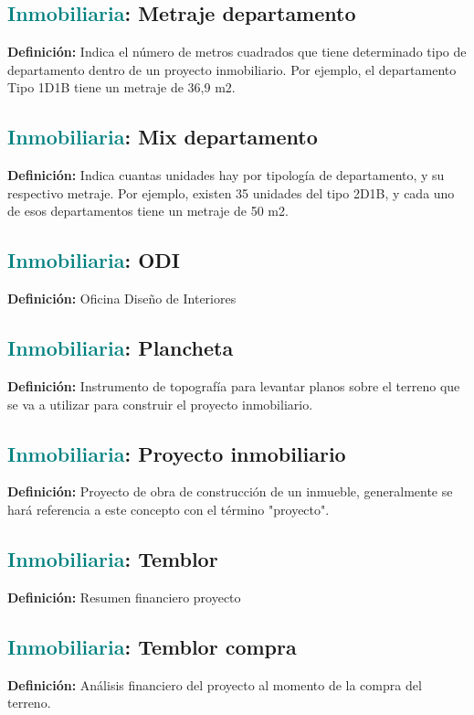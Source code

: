 \documentclass[12pt]{article}
\begin{document}
\subsection{\textcolor{teal}{Inmobiliaria}: Metraje departamento}
\textbf{Definición:} Indica el número de metros cuadrados que tiene determinado tipo de departamento dentro de un proyecto inmobiliario. Por ejemplo, el departamento Tipo 1D1B tiene un metraje de 36,9 m2.
\subsection{\textcolor{teal}{Inmobiliaria}: Mix departamento}
\textbf{Definición:} Indica cuantas unidades hay por tipología de departamento, y su respectivo metraje. Por ejemplo, existen 35 unidades del tipo 2D1B, y cada uno de esos departamentos tiene un metraje de 50 m2.
\subsection{\textcolor{teal}{Inmobiliaria}: ODI}
\textbf{Definición:} Oficina Diseño de Interiores
\subsection{\textcolor{teal}{Inmobiliaria}: Plancheta}
\textbf{Definición:} Instrumento de topografía para levantar planos sobre el terreno que se va a utilizar para construir el proyecto inmobiliario.
\subsection{\textcolor{teal}{Inmobiliaria}: Proyecto inmobiliario}
\textbf{Definición:} Proyecto de obra de construcción de un inmueble, generalmente se hará referencia a este concepto con el término "proyecto".
\subsection{\textcolor{teal}{Inmobiliaria}: Temblor}
\textbf{Definición:} Resumen financiero proyecto
\subsection{\textcolor{teal}{Inmobiliaria}: Temblor compra}
\textbf{Definición:} Análisis financiero del proyecto al momento de la compra del terreno.
\end{document}
